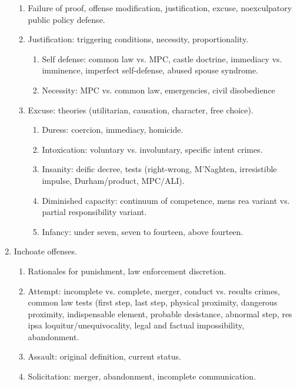 \begin{enumerate}
\begin{enumerate}
        \item Failure of proof, offense modification, justification, excuse, 
        noexculpatory public policy defense.
        \item Justification: triggering conditions, necessity, 
        proportionality.
        \begin{enumerate}
            \item Self defense: common law vs. MPC, castle doctrine, 
            immediacy vs. imminence, imperfect self-defense, abused spouse 
            syndrome.
            \item Necessity: MPC vs. common law, emergencies, civil 
            disobedience
        \end{enumerate}
        \item Excuse: theories (utilitarian, causation, character, free 
        choice).
        \begin{enumerate}
            \item Duress: coercion, immediacy, homicide.
            \item Intoxication: voluntary vs. involuntary, specific intent 
            crimes.
            \item Insanity: deific decree, tests (right-wrong, M'Naghten, 
            irresistible impulse, Durham/product, MPC/ALI).
            \item Diminished capacity: continuum of competence, mens rea 
            variant vs. partial responsibility variant.
            \item Infancy: under seven, seven to fourteen, above fourteen.
        \end{enumerate}
    \end{enumerate}
    \item Inchoate offenses.
    \begin{enumerate}
        \item Rationales for punishment, law enforcement discretion.
        \item Attempt: incomplete vs. complete, merger, conduct vs. results 
        crimes, common law tests (first step, last step, physical proximity, 
        dangerous proximity, indispensable element, probable desistance, 
        abnormal step, res ipsa loquitur/unequivocality, legal and factual 
        impossibility, abandonment.
        \item Assault: original definition, current status.
        \item Solicitation: merger, abandonment, incomplete communication.

\end{enumerate}
\end{enumerate}
